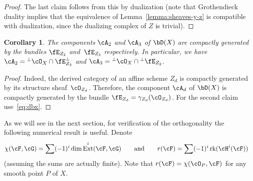 \documentclass[11pt]{amsart}
\DeclareMathOperator{\Ext}{\mathrm{Ext}}
\DeclareMathOperator{\rank}{\mathrm{rk}}
\theoremstyle{plain}
\newtheorem{corollary}[theorem]{Corollary}
\theoremstyle{definition}
\theoremstyle{remark}
\begin{document}
\begin{proof}
The last claim follows from this by dualization (note that Grothendieck duality implies that the equivalence of Lemma~\ref{lemma:sheaves-y-z} is compatible with dualization, since the dualizing complex of $Z$ is trivial).
\end{proof}

\begin{corollary}\label{corollary:a-as-orthogonals}
The components $\cA_2$ and $\cA_3$ of $\bD(X)$ are compactly generated by the bundles $\fE_{Z_2}$ and~$\fE_{Z_3}$ respectively.
In particular, we have $\cA_2 = {}^\perp \cO_X \cap \fE_{Z_3}^\perp$ and $\cA_3 = {}^\perp \cO_X \cap {}^\perp\fE_{Z_2}$.
\end{corollary}
\begin{proof}
Indeed, the derived category of an affine scheme $Z_d$ is compactly generated by its structure sheaf~$\cO_{Z_d}$.
Therefore, the component $\cA_d$ of $\bD(X)$ is compactly generated by the bundle $\fE_{Z_d} = \gamma_{Z_d}(\cO_{Z_d})$.
For the second claim use~\eqref{eq:dbx}.
\end{proof}


As we will see in the next section, for verification of the orthogonality the following numerical result is useful.
Denote 
\begin{equation*}
\chi(\cF,\cG) = \sum (-1)^i \dim \Ext^i(\cF,\cG)
\qquad\text{and}\qquad 
r(\cF) = \sum (-1)^i \rank(\cH^i(\cF))
\end{equation*}
(assuming the sums are actually finite).
Note that $r(\cF) = \chi(\cO_P,\cF)$ for any smooth point $P$ of $X$.
\end{document}
